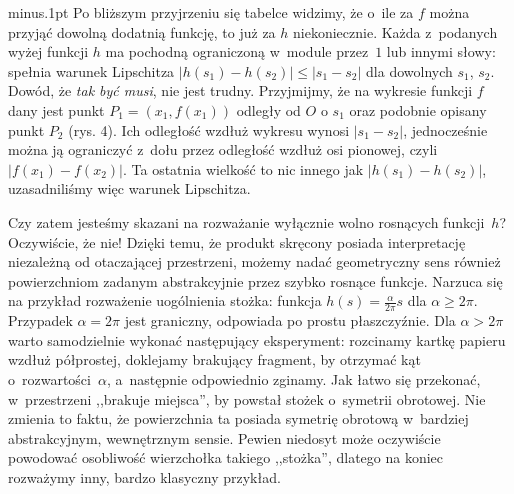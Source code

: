 \baselineskip12pt minus.1pt
Po bliższym przyjrzeniu się tabelce widzimy, że o~ile za $f$ można przyjąć dowolną dodatnią funkcję, to już za $h$ niekoniecznie. Każda z~podanych wyżej funkcji $h$ ma pochodną ograniczoną w~module przez~$1$ lub innymi słowy: spełnia warunek Lipschitza $|h(s_1)-h(s_2)| \le |s_1-s_2|$ dla dowolnych $s_1$, $s_2$. Dowód, że \emph{tak być musi}, nie jest trudny. 
Przyjmijmy, że na wykresie funkcji $f$ dany jest punkt $P_1 = (x_1,f(x_1))$ odległy od $O$ o $s_1$ oraz podobnie opisany punkt $P_2$ (rys. 4). Ich odległość wzdłuż wykresu wynosi $|s_1-s_2|$, jednocześnie można ją ograniczyć z~dołu przez odległość wzdłuż osi pionowej, czyli $|f(x_1)-f(x_2)|$. Ta ostatnia wielkość to nic innego jak $|h(s_1)-h(s_2)|$, uzasadniliśmy więc warunek Lipschitza. 

Czy zatem jesteśmy skazani na rozważanie wyłącznie wolno rosnących funkcji~$h$? Oczywiście, że nie! Dzięki temu, że produkt skręcony posiada interpretację niezależną od otaczającej przestrzeni, możemy nadać geometryczny sens również powierzchniom zadanym abstrakcyjnie przez szybko rosnące funkcje. Narzuca się na przykład rozważenie uogólnienia stożka: funkcja $h(s) = \frac{\alpha}{2\pi} s$ dla $\alpha \ge 2 \pi$. Przypadek $\alpha = 2 \pi$ jest graniczny, odpowiada po prostu płaszczyźnie. Dla $\alpha > 2 \pi$ warto samodzielnie wykonać następujący eksperyment: rozcinamy kartkę papieru wzdłuż półprostej, doklejamy brakujący fragment, by otrzymać kąt o~rozwartości~$\alpha$, a~następnie odpowiednio zginamy. Jak łatwo się przekonać, w~przestrzeni ,,brakuje miejsca'', by powstał stożek o~symetrii obrotowej. Nie zmienia to faktu, że powierzchnia ta posiada symetrię obrotową w~bardziej abstrakcyjnym, wewnętrznym sensie. Pewien niedosyt może oczywiście powodować osobliwość wierzchołka takiego ,,stożka'', dlatego na koniec rozważymy inny, bardzo klasyczny przykład. 

